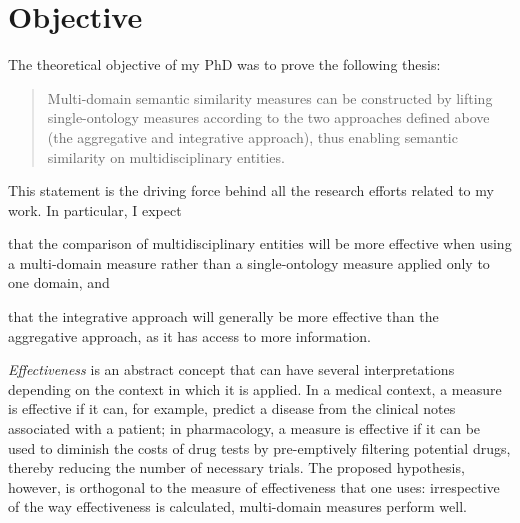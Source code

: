 \section{Objective} \label{sec:intro/objective}

The theoretical objective of my PhD was to prove the following thesis:

\begin{quote}
Multi-domain semantic similarity measures can be constructed by lifting single-ontology measures according to the two approaches defined above (the aggregative and integrative approach), thus enabling semantic similarity on multidisciplinary entities.
\end{quote}
This statement is the driving force behind all the research efforts related to my work. In particular, I expect
\begin{paralist}
    \item that the comparison of multidisciplinary entities will be more effective when using a multi-domain measure rather than a single-ontology measure applied only to one domain, and
    \item that the integrative approach will generally be more effective than the aggregative approach, as it has access to more information.
\end{paralist}

\emph{Effectiveness} is an abstract concept that can have several interpretations depending on the context in which it is applied. In a medical context, a measure is effective if it can, for example, predict a disease from the clinical notes associated with a patient; in pharmacology, a measure is effective if it can be used to diminish the costs of drug tests by pre-emptively filtering potential drugs, thereby reducing the number of necessary trials. The proposed hypothesis, however, is orthogonal to the measure of effectiveness that one uses: irrespective of the way effectiveness is calculated, multi-domain measures perform well.


